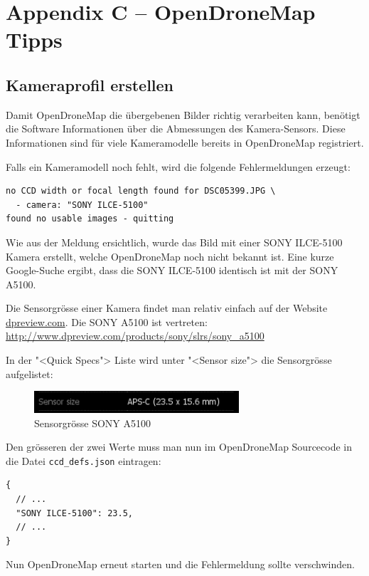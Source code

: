 \chapter{Appendix C -- OpenDroneMap Tipps}

\section{Kameraprofil erstellen}

\label{ch:odm-camera-profile}

Damit OpenDroneMap die übergebenen Bilder richtig verarbeiten kann, benötigt die
Software Informationen über die Abmessungen des Kamera-Sensors. Diese
Informationen sind für viele Kameramodelle bereits in OpenDroneMap registriert.

Falls ein Kameramodell noch fehlt, wird die folgende Fehlermeldungen erzeugt:

\begin{verbatim}
no CCD width or focal length found for DSC05399.JPG \
  - camera: "SONY ILCE-5100"
found no usable images - quitting
\end{verbatim}

Wie aus der Meldung ersichtlich, wurde das Bild mit einer SONY ILCE-5100 Kamera
erstellt, welche OpenDroneMap noch nicht bekannt ist. Eine kurze Google-Suche ergibt,
dass die SONY ILCE-5100 identisch ist mit der SONY A5100.

Die Sensorgrösse einer Kamera findet man relativ einfach auf der Website
\url{dpreview.com}. Die SONY A5100 ist vertreten:
\url{http://www.dpreview.com/products/sony/slrs/sony_a5100}

In der "<Quick Specs"> Liste wird unter "<Sensor size"> die Sensorgrösse
aufgelistet:

\begin{figure}[H]
	\centering
	\includegraphics[width=3in]{images/sensor.png}
	\caption{Sensorgrösse SONY A5100}
\end{figure}

Den grösseren der zwei Werte muss man nun im OpenDroneMap Sourcecode in die
Datei \texttt{ccd\_defs.json} eintragen:

\begin{verbatim} 
{
  // ...
  "SONY ILCE-5100": 23.5,
  // ...
}
\end{verbatim}

Nun OpenDroneMap erneut starten und die Fehlermeldung sollte verschwinden.
